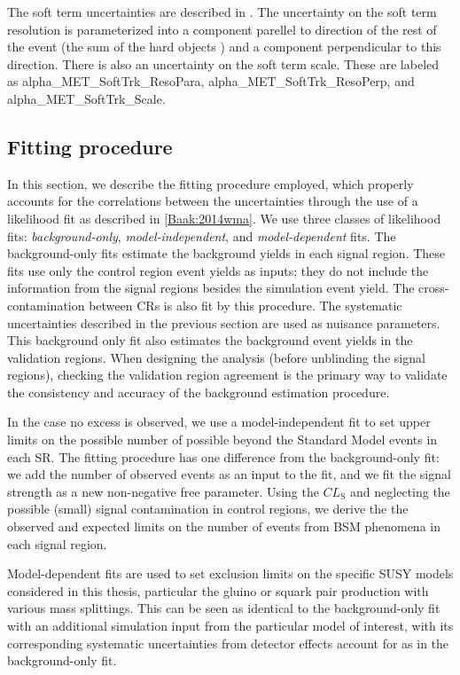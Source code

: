The \met soft term uncertainties are described in \cite{PERF-2014-04,ATL-PHYS-PUB-2015-023,ATL-PHYS-PUB-2015-027}.
The uncertainty on the \met soft term resolution is parameterized into a component parellel to direction of the rest of the event (the sum of the hard objects \pt) and a component perpendicular to this direction.
There is also an uncertainty on the \met soft term scale.
These are labeled as alpha\_MET\_SoftTrk\_ResoPara, alpha\_MET\_SoftTrk\_ResoPerp, and alpha\_MET\_SoftTrk\_Scale.

\subsection{Fitting procedure}

In this section, we describe the fitting procedure employed, which properly accounts for the correlations between the uncertainties through the use of a likelihood fit as described in \ref{Baak:2014wma}.
We use three classes of likelihood fits: \textit{background-only}, \textit{model-independent}, and \textit{model-dependent} fits.
The background-only fits estimate the background yields in each signal region.
These fits use only the control region event yields as inputs; they do not include the information from the signal regions besides the simulation event yield.
The cross-contamination between CRs is also fit by this procedure.
The systematic uncertainties described in the previous section are used as nuisance parameters.
This background only fit also estimates the background event yields in the validation regions.
When designing the analysis (before unblinding the signal regions), checking the validation region agreement is the primary way to validate the consistency and accuracy of the background estimation procedure.

In the case no excess is observed, we use a model-independent fit to set upper limits on the possible number of possible beyond the Standard Model events in each SR.
The fitting procedure has one difference from the background-only fit: we add the number of observed events as an input to the fit, and we fit the signal strength as a new non-negative free parameter.
Using the $CL_{\mathrm{S}}$\cite{Feldman:1997qc} and neglecting the possible (small) signal contamination in control regions, we derive the the observed and expected limits on the number of events from BSM phenomena in each signal region.

Model-dependent fits are used to set exclusion limits on the specific SUSY models considered in this thesis, particular the gluino or squark pair production with various mass splittings.
This can be seen as identical to the background-only fit with an additional simulation input from the particular model of interest, with its corresponding systematic uncertainties from detector effects account for as in the background-only fit.